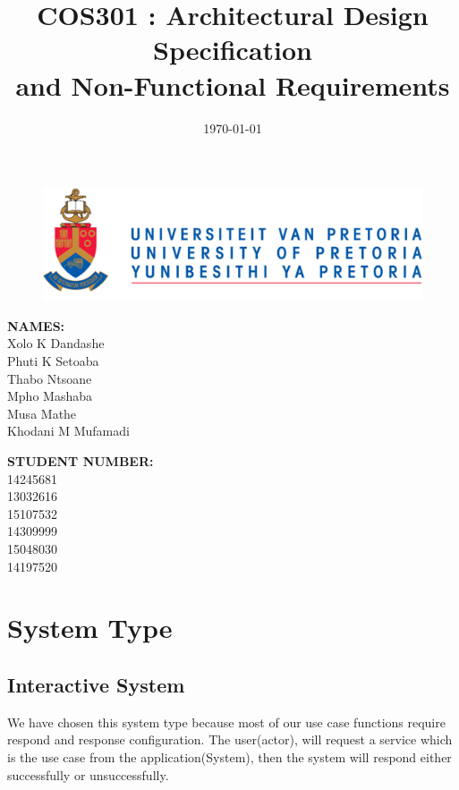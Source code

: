 \documentclass[english]{article}
\title{COS301 : Architectural Design Specification \\and Non-Functional Requirements}
\date{\today}
\begin{document}
	\maketitle
	\begin{figure}[!t]
		\includegraphics{up_logo.png}
	\end{figure}
	\begin{minipage}{0.4\textwidth}
		\begin{flushleft} \large
			\textbf{NAMES:}\\[0.4cm]
			Xolo K Dandashe\\
			Phuti K Setoaba\\
			Thabo Ntsoane\\
			Mpho Mashaba\\	
			Musa Mathe\\
			Khodani M Mufamadi

		\end{flushleft}
	\end{minipage}
	\begin{minipage}{0.4\textwidth}
		\begin{flushright} \large
			\textbf{STUDENT NUMBER:} \\[0.4cm]
		 	14245681\\ 	
		 	13032616\\		
		 	15107532\\	
		 	14309999\\		
		 	15048030\\	
		 	14197520
		\end{flushright}
	\end{minipage}


	
	\newpage

	\tableofcontents
	
	\newpage
	\section{System Type} 
	\subsection{Interactive System}
		We have chosen this system type because most of our use case functions require respond and response configuration. The user(actor), will request a service which is the use case from the application(System), then the system will respond either successfully or unsuccessfully.
		
\end{document}
